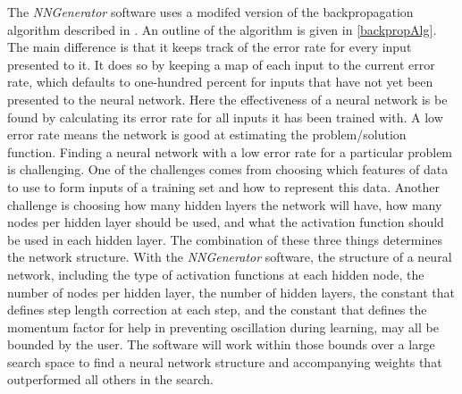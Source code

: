 The {\it NNGenerator} software uses a modifed version of the
backpropagation algorithm described in \cite{rojas3}.
An outline of the algorithm is given in \ref{backpropAlg}.
The main difference is that it keeps track of the error rate for every
input presented to it.
It does so by keeping a map of each input to the current error rate,
which defaults to one-hundred percent for inputs that have not yet
been presented to the neural network.
Here the effectiveness of a neural network is be found by calculating
its error rate for all inputs it has been trained with. 
A low error rate means the network is good at estimating the
problem/solution function. 
Finding a neural network with a low error rate for a particular
problem is challenging. 
One of the challenges comes from choosing which features of data to
use to form inputs of a training set and how to represent this data. 
Another challenge is choosing how many hidden layers the network will
have, how many nodes per hidden layer should be used, and what the
activation function should be used in each hidden layer. 
The combination of these three things determines the network structure. 
With the {\it NNGenerator} software, the structure of a neural
network, including the type of activation functions at each hidden
node, the number of nodes per hidden layer, the number of hidden
layers, the constant that defines step length correction at each step,
and the constant that defines the momentum factor for help in
preventing oscillation during learning, may all be bounded by the
user.
The software will work within those bounds over a large search space
to find a neural network structure and accompanying weights that
outperformed all others in the search.

